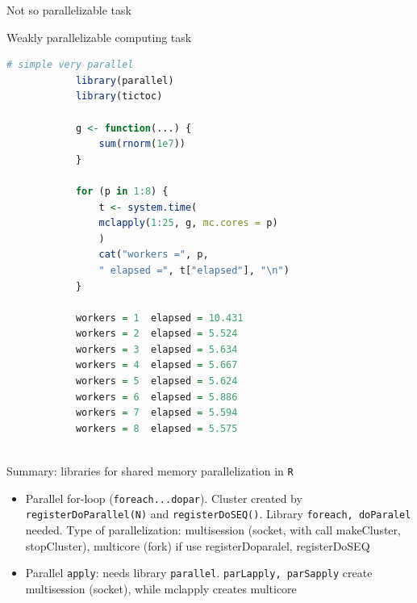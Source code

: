 \documentclass[compress,xcolor=table]{beamer}
\begin{document}
\begin{frame}[fragile]{Not so parallelizable task}
	\begin{block}{Weakly parallelizable computing task}\tiny
		\begin{lstlisting}[basicstyle=\color{blue}\tiny\ttfamily,language=R,escapeinside=`']
			# simple very parallel
			library(parallel)
			library(tictoc)
			
			g <- function(...) {
				sum(rnorm(1e7))
			}
			
			for (p in 1:8) {
				t <- system.time(
				mclapply(1:25, g, mc.cores = p)
				)	
				cat("workers =", p,
				" elapsed =", t["elapsed"], "\n")
			}
			
			workers = 1  elapsed = 10.431 
			workers = 2  elapsed = 5.524 
			workers = 3  elapsed = 5.634 
			workers = 4  elapsed = 5.667 
			workers = 5  elapsed = 5.624 
			workers = 6  elapsed = 5.886 
			workers = 7  elapsed = 5.594 
			workers = 8  elapsed = 5.575 
			
		\end{lstlisting}
	\end{block}
\end{frame}


\begin{frame}{Summary: libraries for shared memory parallelization in {\tt R}}
\begin{itemize}
	\item Parallel for-loop ({\tt foreach...dopar}). Cluster created by {\tt registerDoParallel(N)} and {\tt registerDoSEQ()}. Library {\tt foreach, doParalel} needed. Type of parallelization: multisession (socket, with call makeCluster, stopCluster), multicore (fork) if use registerDoparalel, registerDoSEQ
	\item Parallel {\tt apply}:  needs library {\tt parallel}. {\tt parLapply, parSapply} create multisession (socket), while mclapply creates multicore 
\end{itemize}
\end{frame}
\end{document}
